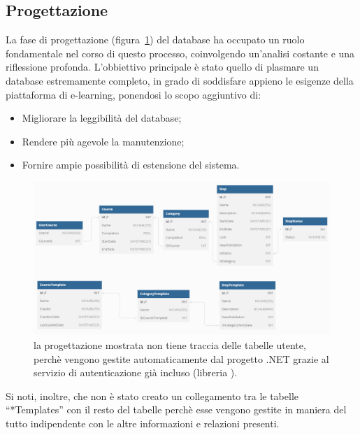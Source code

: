 \subsection{Progettazione}
La fase di progettazione (figura~\ref{fig:progettazione_database}) del database ha occupato un ruolo
fondamentale nel corso di questo processo, coinvolgendo un'analisi costante e
una riflessione profonda. L'obbiettivo principale è stato quello di plasmare un
database estremamente completo, in grado di soddisfare appieno le esigenze
della piattaforma di e-learning, ponendosi lo scopo aggiuntivo di:
\begin{itemize}
	\item Migliorare la leggibilità del database;
	\item Rendere più agevole la manutenzione;
	\item Fornire ampie possibilità di estensione del sistema.
\end{itemize}
\begin{figure}[H]
	\centering
	\includegraphics[width=\textwidth]{img/progettazione_database.png}
	\caption[progettazione del database]{la progettazione mostrata non tiene traccia delle tabelle utente, perchè vengono
	gestite automaticamente dal progetto .NET grazie al servizio di autenticazione già
	incluso (libreria ).}
	\label{fig:progettazione_database}
\end{figure}
%
Si noti, inoltre, che non è stato creato un collegamento tra le tabelle “*Templates” con il resto del tabelle
perchè esse vengono gestite in maniera del tutto indipendente con le altre informazioni e relazioni presenti.
